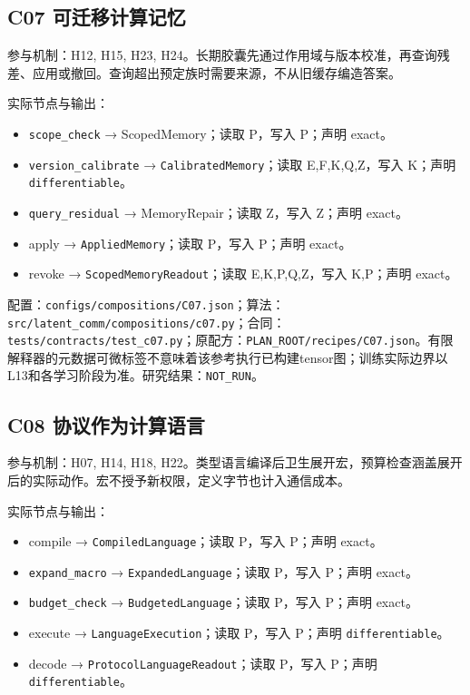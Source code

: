 \documentclass[
  10pt,
]{article}
\begin{document}
\subsection{C07
可迁移计算记忆}\label{c07-ux53efux8fc1ux79fbux8ba1ux7b97ux8bb0ux5fc6}

参与机制：H12, H15, H23,
H24。长期胶囊先通过作用域与版本校准，再查询残差、应用或撤回。查询超出预定族时需要来源，不从旧缓存编造答案。

实际节点与输出：

\begin{itemize}
\item
  \nolinkurl{scope_check} → ScopedMemory；读取 P，写入 P；声明 exact。
\item
  \nolinkurl{version_calibrate} → \nolinkurl{CalibratedMemory}；读取
  E,F,K,Q,Z，写入 K；声明 \nolinkurl{differentiable}。
\item
  \nolinkurl{query_residual} → MemoryRepair；读取 Z，写入 Z；声明
  exact。
\item
  apply → \nolinkurl{AppliedMemory}；读取 P，写入 P；声明 exact。
\item
  revoke → \nolinkurl{ScopedMemoryReadout}；读取 E,K,P,Q,Z，写入
  K,P；声明 exact。
\end{itemize}

配置：{\small\nolinkurl{configs/compositions/C07.json}}；算法：{\small\nolinkurl{src/latent_comm/compositions/c07.py}}；合同：{\small\nolinkurl{tests/contracts/test_c07.py}}；原配方：{\small\nolinkurl{PLAN_ROOT/recipes/C07.json}}。有限解释器的元数据可微标签不意味着该参考执行已构建tensor图；训练实际边界以L13和各学习阶段为准。研究结果：\nolinkurl{NOT_RUN}。

\subsection{C08
协议作为计算语言}\label{c08-ux534fux8baeux4f5cux4e3aux8ba1ux7b97ux8bedux8a00}

参与机制：H07, H14, H18,
H22。类型语言编译后卫生展开宏，预算检查涵盖展开后的实际动作。宏不授予新权限，定义字节也计入通信成本。

实际节点与输出：

\begin{itemize}
\item
  compile → \nolinkurl{CompiledLanguage}；读取 P，写入 P；声明 exact。
\item
  \nolinkurl{expand_macro} → \nolinkurl{ExpandedLanguage}；读取 P，写入
  P；声明 exact。
\item
  \nolinkurl{budget_check} → \nolinkurl{BudgetedLanguage}；读取 P，写入
  P；声明 exact。
\item
  execute → \nolinkurl{LanguageExecution}；读取 P，写入 P；声明
  \nolinkurl{differentiable}。
\item
  decode → \nolinkurl{ProtocolLanguageReadout}；读取 P，写入 P；声明
  \nolinkurl{differentiable}。
\end{itemize}
\end{document}
